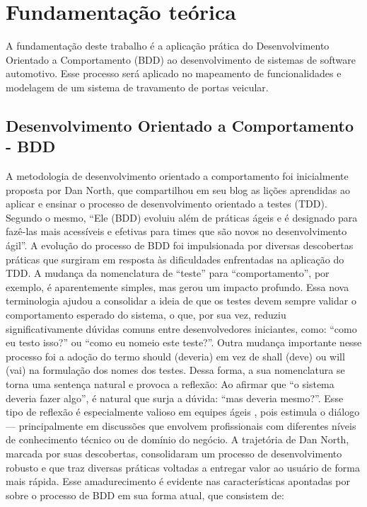 \chapter{Fundamentação teórica}

A fundamentação deste trabalho é a aplicação prática do Desenvolvimento Orientado a Comportamento (BDD) ao desenvolvimento de sistemas de software automotivo. 
Esse processo será aplicado no mapeamento de funcionalidades e modelagem de um sistema de travamento de portas veicular.

\section{Desenvolvimento Orientado a Comportamento - BDD}

A metodologia de desenvolvimento orientado a comportamento foi inicialmente proposta por Dan North, que compartilhou em seu blog \cite{north2006bdd} as lições 
aprendidas ao aplicar e ensinar o processo de desenvolvimento orientado a testes (TDD). Segundo o mesmo, “Ele (BDD) evoluiu além de práticas ágeis e é designado 
para fazê-las mais acessíveis e efetivas para times que são novos no desenvolvimento ágil”.
A evolução do processo de BDD foi impulsionada por diversas descobertas práticas que surgiram em resposta às dificuldades enfrentadas na aplicação do TDD. A mudança 
da nomenclatura de “teste” para “comportamento”, por exemplo, é aparentemente simples, mas gerou um impacto profundo. Essa nova terminologia ajudou a consolidar a 
ideia de que os testes devem sempre validar o comportamento esperado do sistema, o que, por sua vez, reduziu significativamente dúvidas comuns entre desenvolvedores 
iniciantes, como: “como eu testo isso?” ou “como eu nomeio este teste?”.
Outra mudança importante nesse processo foi a adoção do termo should (deveria) em vez de shall (deve) ou will (vai) na formulação dos nomes dos testes. Dessa forma, 
a sua nomenclatura se torna uma sentença natural e provoca a reflexão: Ao afirmar que “o sistema deveria fazer algo”, é natural que surja a dúvida: “mas deveria mesmo?”. 
Esse tipo de reflexão é especialmente valioso em equipes ágeis \cite{atlassianAgileTeams}, pois estimula o diálogo — principalmente em discussões que envolvem 
profissionais com diferentes níveis de conhecimento técnico ou de domínio do negócio.
A trajetória de Dan North, marcada por suas descobertas, consolidaram um processo de desenvolvimento robusto e que traz diversas práticas voltadas a entregar valor 
ao usuário de forma mais rápida. Esse amadurecimento é evidente nas características apontadas por \cite{studyBDD} sobre o processo de BDD em sua forma atual, que consistem de:

